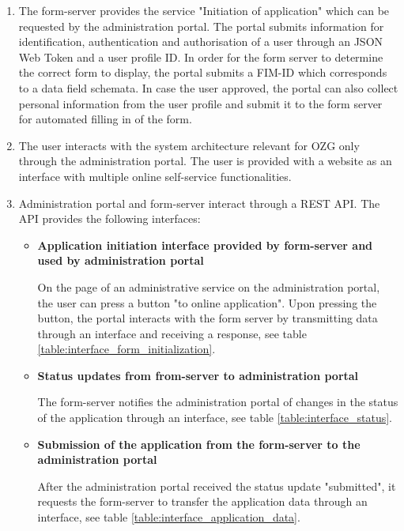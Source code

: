 \documentclass[
     12pt,         %
     a4paper,      %
     BCOR=10mm,version=first,     %
     DIV=14,version=first,        %
     ]{scrreprt}
\begin{document}
\begin{enumerate}

    \item The form-server provides the service "Initiation of application" which can be requested by the administration portal. The portal submits information for identification, authentication and authorisation of a user through an JSON Web Token and a user profile ID. In order for the form server to determine the correct form to display, the portal submits a FIM-ID which corresponds to a data field schemata. In case the user approved, the portal can also collect personal information from the user profile and submit it to the form server for automated filling in of the form.
    

    \item The user interacts with the system architecture relevant for OZG only through the administration portal. The user is provided with a website as an interface with multiple online self-service functionalities.
    \item Administration portal and form-server interact through a REST API. The API provides the following interfaces:
    \begin{itemize}
        \item \textbf{Application initiation interface provided by form-server and used by administration portal}
        
        On the page of an administrative service on the administration portal, the user can press a button "to online application". Upon pressing the button, the portal interacts with the form server by transmitting data through an interface and receiving a response, see table \ref{table:interface_form_initialization}.
        

        \item \textbf{Status updates from from-server to administration portal}
        
        The form-server notifies the administration portal of changes in the status of the application through an interface, see table \ref{table:interface_status}.
        

        
        \item \textbf{Submission of the application from the form-server to the administration portal}
        
        After the administration portal received the status update "submitted", it requests the form-server to transfer the application data through an interface, see table \ref{table:interface_application_data}.
        


\end{itemize}
\end{enumerate}
\end{document}
